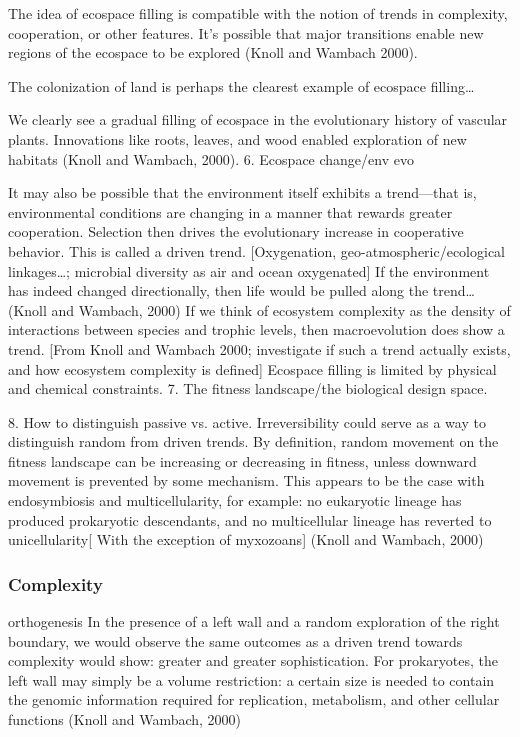 \documentclass{tufte-book} %
\begin{document}
The idea of ecospace filling is compatible with the notion of trends in complexity, cooperation, or other features. It’s possible that major transitions enable new regions of the ecospace to be explored (Knoll and Wambach 2000). 

The colonization of land is perhaps the clearest example of ecospace filling…

We clearly see a gradual filling of ecospace in the evolutionary history of vascular plants. Innovations like roots, leaves, and wood enabled exploration of new habitats (Knoll and Wambach, 2000). 
6. Ecospace change/env evo

It may also be possible that the environment itself exhibits a trend—that is, environmental conditions are changing in a manner that rewards greater cooperation. Selection then drives the evolutionary increase in cooperative behavior.  This is called a driven trend. 
[Oxygenation, geo-atmospheric/ecological linkages…; microbial diversity as air and ocean oxygenated]
If the environment has indeed changed directionally, then life would be pulled along the trend…(Knoll and Wambach, 2000)
If we think of ecosystem complexity as the density of interactions between species and trophic levels, then macroevolution does show a trend. [From Knoll and Wambach 2000; investigate if such a trend actually exists, and how ecosystem complexity is defined] 
Ecospace filling is limited by physical and chemical constraints.
7. The fitness landscape/the biological design space.

8. How to distinguish passive vs. active.
Irreversibility could serve as a way to distinguish random from driven trends. By definition, random movement on the fitness landscape can be increasing or decreasing in fitness, unless downward movement is prevented by some mechanism. This appears to be the case with endosymbiosis and multicellularity, for example: no eukaryotic lineage has produced prokaryotic descendants, and no multicellular lineage has reverted to unicellularity[ With the exception of myxozoans] (Knoll and Wambach, 2000)



\subsubsection{Complexity}\label{arrow:complexity}

orthogenesis
In the presence of a left wall and a random exploration of the right boundary, we would observe the same outcomes as a driven trend towards complexity would show: greater and greater sophistication. 
For prokaryotes, the left wall may simply be a volume restriction: a certain size is needed to contain the genomic information required for replication, metabolism, and other cellular functions (Knoll and Wambach, 2000)
\end{document}

